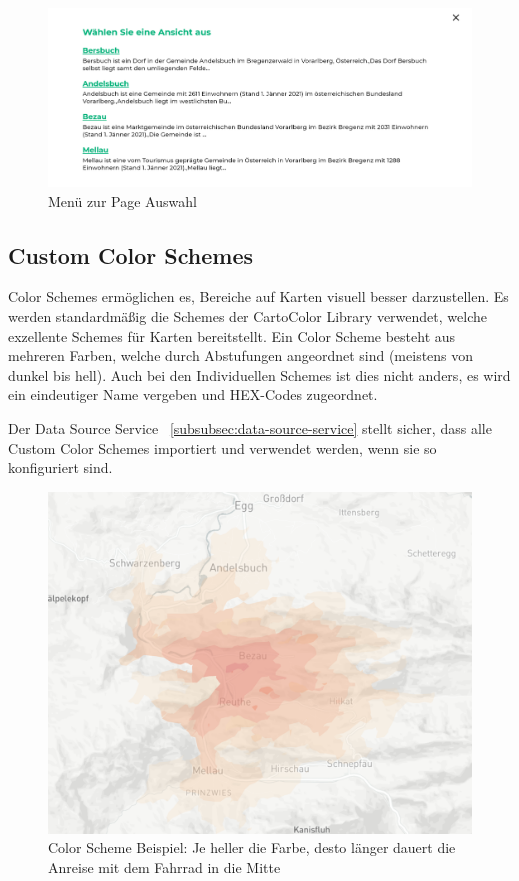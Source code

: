 \begin{figure}[hbt!]
    \centering
    \includegraphics[scale=.9]{pics/menu}
    \caption{Menü zur Page Auswahl}
    \label{fig:menu}
\end{figure}

\subsection{Custom Color Schemes}
Color Schemes ermöglichen es, Bereiche auf Karten visuell besser darzustellen.
Es werden standardmäßig die Schemes der CartoColor Library verwendet, welche exzellente Schemes für Karten bereitstellt.
Ein Color Scheme besteht aus mehreren Farben, welche durch Abstufungen angeordnet sind (meistens von dunkel bis hell).
Auch bei den Individuellen Schemes ist dies nicht anders, es wird ein eindeutiger Name vergeben und HEX-Codes zugeordnet.

Der Data Source Service ~\ref{subsubsec:data-source-service} stellt sicher, dass alle Custom Color Schemes importiert und verwendet werden, wenn sie so konfiguriert sind.

\begin{figure}[hbt!]
    \centering
    \includegraphics[scale=.6]{pics/color-scheme-example}
    \caption{Color Scheme Beispiel: Je heller die Farbe, desto länger dauert die Anreise mit dem Fahrrad in die Mitte}
    \label{fig:color-scheme-example}
\end{figure}

